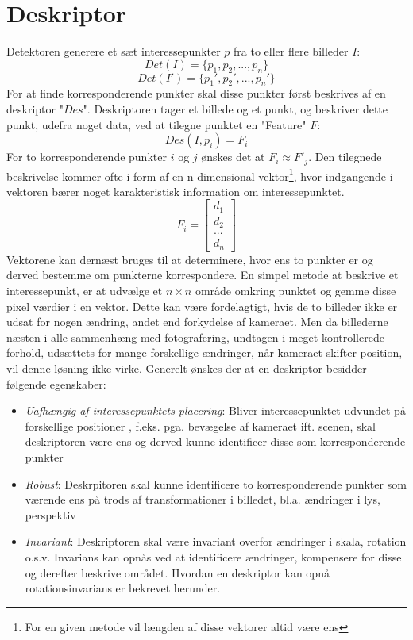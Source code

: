 \section{Deskriptor}
Detektoren generere et sæt interessepunkter $p$ fra to eller flere billeder $I$:
$$ Det(I) = \lbrace p_1,p_2,...,p_n \rbrace $$$$
Det(I') = \lbrace p_1',p_2',...,p_n' \rbrace
$$
For at finde korresponderende punkter skal disse punkter først beskrives af en deskriptor "$Des$". Deskriptoren tager et billede og et punkt, og beskriver dette punkt, udefra noget data, ved at tilegne punktet en "Feature" $F$:
$$ Des(I,p_i)=F_i $$
For to korresponderende punkter $i$ og $j$ ønskes det at $F_i \approx F'_j$. Den tilegnede beskrivelse kommer ofte i form af en n-dimensional vektor\footnote{For en given metode vil længden af disse vektorer altid være ens}, hvor indgangende i vektoren bærer noget karakteristisk information om interessepunktet. 
$$ F_i =
\begin{bmatrix}
d_1 \\
d_2 \\
. . . \\
d_n
\end{bmatrix}
$$ Vektorene kan dernæst bruges til at determinere, hvor ens to punkter er og derved bestemme om punkterne korrespondere. En simpel metode at beskrive et interessepunkt, er at udvælge et $n \times n$ område omkring punktet og gemme disse pixel værdier i en vektor. Dette kan være fordelagtigt, hvis de to billeder ikke er udsat for nogen ændring, andet end forkydelse af kameraet. Men da billederne næsten i alle sammenhæng med fotografering, undtagen i meget kontrollerede forhold, udsættets for mange forskellige ændringer, når kameraet skifter position, vil denne løsning ikke virke. Generelt ønskes der at en deskriptor besidder følgende egenskaber:
\begin{itemize}
\item{ \textit{Uafhængig af interessepunktets placering}:
Bliver interessepunktet udvundet på forskellige positioner , f.eks. pga. bevægelse af kameraet ift. scenen, skal deskriptoren være ens og derved kunne identificer disse som korresponderende punkter
 }
\item{\textit{Robust}: Deskrpitoren skal kunne identificere to korresponderende punkter som værende ens på trods af transformationer i billedet, bl.a. ændringer i lys, perspektiv}
\item{\textit{Invariant}: Deskriptoren skal være invariant overfor ændringer i skala, rotation o.s.v. Invarians kan opnås ved at identificere ændringer, kompensere for disse og derefter beskrive området.
Hvordan en deskriptor kan opnå rotationsinvarians er bekrevet herunder.}
\end{itemize}
